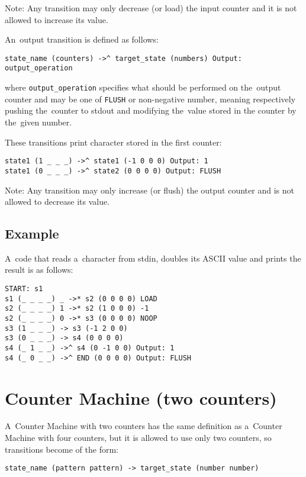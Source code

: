 \documentclass[english,shortabstract,mgr]{iithesis}
\begin{document}
Note: Any transition may only decrease (or load) the input counter
and it is not allowed to increase its value.

An~output transition is defined as follows:
\begin{verbatim}
state_name (counters) ->^ target_state (numbers) Output: output_operation
\end{verbatim}

where \texttt{output\_operation} specifies what should be performed on the~output
counter and may be one of \texttt{FLUSH} or non-negative number, meaning
respectively pushing the~counter to stdout and modifying the~value stored
in the counter by the~given number.

These transitions print character stored in the first counter:
\begin{verbatim}
state1 (1 _ _ _) ->^ state1 (-1 0 0 0) Output: 1
state1 (0 _ _ _) ->^ state2 (0 0 0 0) Output: FLUSH
\end{verbatim}

Note: Any transition may only increase (or flush) the output counter
and is not allowed to decrease its value.

\subsection{Example}

A~code that reads a~character from stdin, doubles its ASCII value and prints
the result is as follows:
\begin{verbatim}
START: s1
s1 (_ _ _ _) _ ->* s2 (0 0 0 0) LOAD
s2 (_ _ _ _) 1 ->* s2 (1 0 0 0) -1
s2 (_ _ _ _) 0 ->* s3 (0 0 0 0) NOOP
s3 (1 _ _ _) -> s3 (-1 2 0 0)
s3 (0 _ _ _) -> s4 (0 0 0 0)
s4 (_ 1 _ _) ->^ s4 (0 -1 0 0) Output: 1
s4 (_ 0 _ _) ->^ END (0 0 0 0) Output: FLUSH
\end{verbatim}

\section {Counter Machine (two counters)}

A~Counter Machine with two counters has the same definition as
a~Counter Machine with four counters, but it is allowed to use only
two counters, so transitions become of the form:

\begin{verbatim}
state_name (pattern pattern) -> target_state (number number)
\end{verbatim}
\end{document}
